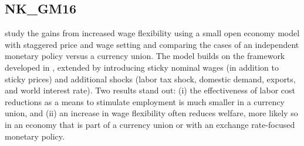 \documentclass[11pt,a4paper]{article}
\begin{document}
	
	\subsection{NK\_GM16 \texorpdfstring{\cite{gali2016understanding}}{GalÃƒÂ­ and Monacelli (2016)}}
	\label{NKGM16}
	\cite{gali2016understanding} study the gains from increased wage flexibility using a small open economy model with staggered price and wage setting and comparing the cases of an independent monetary policy versus a currency union. The model builds on the framework developed in \cite{GaliMonacelli2005}, extended by introducing sticky nominal wages (in addition to sticky prices) and additional shocks (labor tax shock, domestic demand, exports, and world interest rate). Two results stand out: (i) the effectiveness of labor cost reductions as a means to stimulate employment is much smaller in a currency union, and (ii) an increase in wage flexibility often reduces welfare, more likely so in an economy that is part of a currency union or with an exchange rate-focused monetary policy.
	
\end{document}
